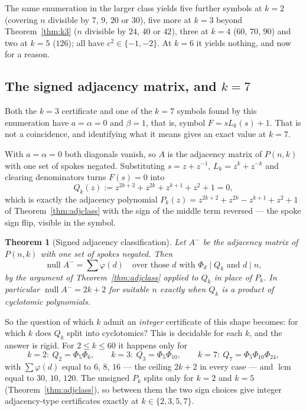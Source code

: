 \documentclass[11pt]{article}
\newtheorem{theorem}{Theorem}
\theoremstyle{definition}
\begin{document}
\noindent
The same enumeration in the larger class yields five further symbols at $k=2$
(covering $n$ divisible by $7$, $9$, $20$ or $30$), five more at $k=3$ beyond
Theorem~\ref{thm:k3} ($n$ divisible by $24$, $40$ or $42$), three at $k=4$
($60$, $70$, $90$) and two at $k=5$ ($126$); all have $c^{2}\in\{-1,-2\}$.
At $k=6$ it yields nothing, and now for a reason.

\subsection*{The signed adjacency matrix, and $k=7$}
Both the $k=3$ certificate and one of the $k=7$ symbols found by this
enumeration have $a=\alpha=0$ and $\beta=1$, that is, symbol $F=sL_k(s)+1$.
That is not a coincidence, and identifying what it means gives an exact value
at $k=7$.

With $a=\alpha=0$ both diagonals vanish, so $A$ is the adjacency matrix of
$P(n,k)$ with one set of spokes negated. Substituting $s=z+z^{-1}$,
$L_k=z^{k}+z^{-k}$ and clearing denominators turns $F(s)=0$ into
\[
  Q_k(z):=z^{2k+2}+z^{2k}+z^{k+1}+z^{2}+1=0,
\]
which is exactly the adjacency polynomial
$P_k(z)=z^{2k+2}+z^{2k}-z^{k+1}+z^{2}+1$ of Theorem~\ref{thm:adjclass} with the
sign of the middle term reversed --- the spoke sign flip, visible in the symbol.

\begin{theorem}[Signed adjacency classification]\label{thm:signedadj}
Let $A^{-}$ be the adjacency matrix of $P(n,k)$ with one set of spokes negated.
Then
\[
  \operatorname{null}A^{-}=\sum\varphi(d)
  \quad\text{over those }d\text{ with }\Phi_d\mid Q_k\text{ and }d\mid n,
\]
by the argument of Theorem~\ref{thm:adjclass} applied to $Q_k$ in place of
$P_k$. In particular $\operatorname{null}A^{-}=2k+2$ for suitable $n$ exactly
when $Q_k$ is a product of cyclotomic polynomials.
\end{theorem}

\noindent
So the question of which $k$ admit an \emph{integer} certificate of this shape
becomes: for which $k$ does $Q_k$ split into cyclotomics? This is decidable for
each $k$, and the answer is rigid. For $2\le k\le60$ it happens only for
\[
  k=2:\ Q_2=\Phi_5\Phi_6,\qquad
  k=3:\ Q_3=\Phi_5\Phi_{10},\qquad
  k=7:\ Q_7=\Phi_5\Phi_{10}\Phi_{24},
\]
with $\sum\varphi(d)$ equal to $6$, $8$, $16$ --- the ceiling $2k+2$ in every
case --- and $\operatorname{lcm}$ equal to $30$, $10$, $120$. The unsigned
$P_k$ splits only for $k=2$ and $k=5$ (Theorem~\ref{thm:adjclass}), so between
them the two sign choices give integer adjacency-type certificates exactly at
$k\in\{2,3,5,7\}$.
\end{document}
